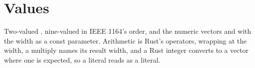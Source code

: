 \section{Values}
\label{sec:x-values}

Two-valued , nine-valued  in IEEE 1164's order,
and the numeric vectors  and  with the width as a
const parameter. Arithmetic is Rust's operators, wrapping at the
width, a multiply names its result width, and a Rust integer converts
to a vector where one is expected, so a literal reads as a literal.


